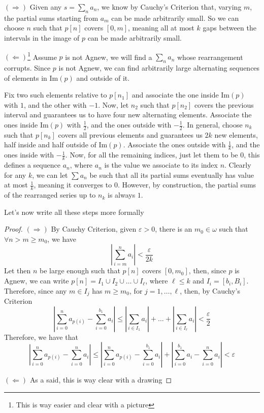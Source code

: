 \begin{sketch}
    $(\Rightarrow)$ Given any $s=\sum_na_n$, we know by Cauchy's Criterion that, varying $m$, the partial sums starting from $a_m$ can be made arbitrarily small. So we can choose $n$ such that $p[n]$ covers $[0,m]$, meaning all at most $k$ gaps between the intervals in the image of $p$ can be made arbitrarily small.

    $(\Leftarrow)$\footnote{This is way easier and clear with a picture} Assume $p$ is not Agnew, we will find a $\sum_na_n$ whose rearrangement corrupts. Since $p$ is not Agnew, we can find arbitrarily large alternating sequences of elements in $\text{Im}(p)$ and outside of it.

    Fix two such elements relative to $p[n_1]$ and associate the one inside $\text{Im}(p)$ with $1$, and the other with $-1$. Now, let $n_2$ such that $p[n_2]$ covers the previous interval and guarantees us to have four new alternating elements. Associate the ones inside $\text{Im}(p)$ with $\frac12$, and the ones outside with $-\frac12$. In general, choose $n_k$ such that $p[n_k]$ covers all previous elements and guarantees us $2k$ new elements, half inside and half outside of $\text{Im}(p)$. Associate the ones outside with $\frac1k$, and the ones inside with $-\frac1k$. Now, for all the remaining indices, just let them to be $0$, this defines a sequence $a_n$, where $a_n$ is the value we associate to its index $n$. Clearly for any $k$, we can let $\sum a_n$ be such that all its partial sums eventually has value at most $\frac1k$, meaning it converges to $0$. However, by construction, the partial sums of the rearranged series up to $n_k$ is always $1$.
\end{sketch}

Let's now write all these steps more formally

\begin{proof}
    $(\Rightarrow)$ By Cauchy Criterion, given $\varepsilon>0$, there is an $m_0\in\omega$ such that $\forall n>m\geq m_0$, we have
    $$\left\lvert\sum_{i=m}^na_i\right\rvert<\frac{\varepsilon}{2k}$$
    Let then $n$ be large enough such that $p[n]$ covers $[0,m_0]$, then, since $p$ is Agnew, we can write $p[n]=I_1\cup I_2\cup\dots\cup I_\ell$, where $\ell\leq k$ and $I_i=[b_i,B_i]$. Therefore, since any $m\in I_j$ has $m\geq m_0$, for $j=1,\dots,\ell$, then, by Cauchy's Criterion
    $$\left\lvert\sum_{i=0}^na_{p(i)}-\sum_{i=0}^{b_1}a_i\right\rvert\leq\left\lvert\sum_{i\in I_1}a_i\right\rvert+\dots+\left\lvert\sum_{i\in I_\ell}a_i\right\rvert<\frac\varepsilon2$$
    Therefore, we have that
    $$\left\lvert\sum_{i=0}^na_{p(i)}-\sum_{i=0}^{n}a_i\right\rvert\leq\left\lvert\sum_{i=0}^na_{p(i)}-\sum_{i=0}^{b_1}a_i\right\rvert+\left\lvert\sum_{i=0}^{b_1}a_i-\sum_{i=0}^na_i\right\rvert<\varepsilon$$

    $(\Leftarrow)$ \textcolor{laser_eyes}{As a said, this is way clear with a drawing}
\end{proof}

